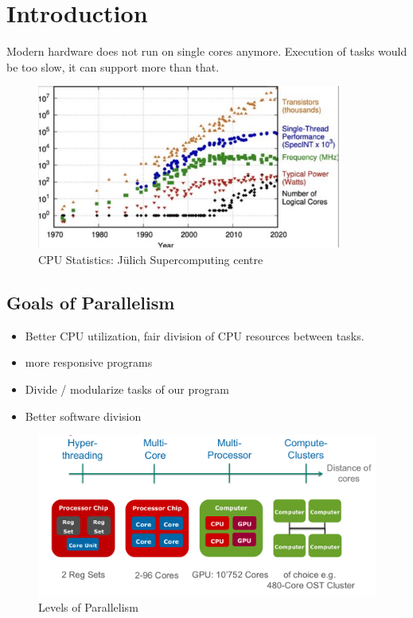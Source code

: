 \section{Introduction}

Modern hardware does not run on single cores anymore. Execution of tasks would be too slow, it can support more than that.

\begin{figure}[H]
    \centering
    \includegraphics*[width=10cm]{res/01-stats.png}
    \caption{CPU Statistics: Jülich Supercomputing centre}
\end{figure}

\subsection*{Goals of Parallelism}

\begin{itemize}
  \item Better CPU utilization, fair division of CPU resources between tasks.
  \item more responsive programs 
  \item Divide / modularize tasks of our program 
  \item Better software division
\end{itemize}

\begin{figure}[H]
  \centering
  \includegraphics[width=12cm]{res/01-levels-of-parallelism}
  \caption{Levels of Parallelism}
\end{figure}

